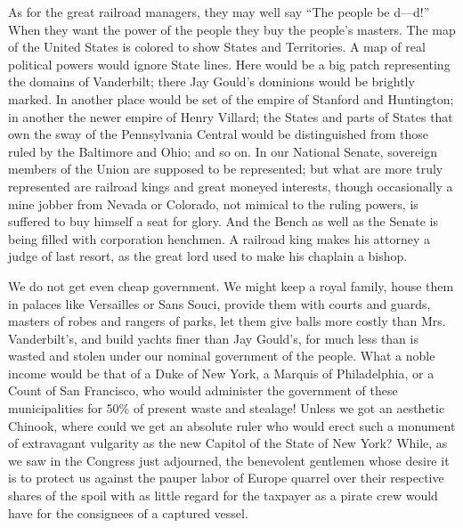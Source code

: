 \documentclass{book}
\begin{document}
As for the great railroad managers, they may well say “The people be d—d!” When they want the power of the people they buy the people’s masters. The map of the United States is colored to show States and Territories. A map of real political powers would ignore State lines. Here would be a big patch representing the domains of Vanderbilt; there Jay Gould’s dominions would be brightly marked. In another place would be set of the empire of Stanford and Huntington; in another the newer empire of Henry Villard; the States and parts of States that own the sway of the Pennsylvania Central would be distinguished from those ruled by the Baltimore and Ohio; and so on. In our National Senate, sovereign members of the Union are supposed to be represented; but what are more truly represented are railroad kings and great moneyed interests, though occasionally a mine jobber from Nevada or Colorado, not mimical to the ruling powers, is suffered to buy himself a seat for glory. And the Bench as well as the Senate is being filled with corporation henchmen. A railroad king makes his attorney a judge of last resort, as the great lord used to make his chaplain a bishop.

We do not get even cheap government. We might keep a royal family, house them in palaces like Versailles or Sans Souci, provide them with courts and guards, masters of robes and rangers of parks, let them give balls more costly than Mrs. Vanderbilt’s, and build yachts finer than Jay Gould’s, for much less than is wasted and stolen under our nominal government of the people. What a noble income would be that of a Duke of New York, a Marquis of Philadelphia, or a Count of San Francisco, who would administer the government of these municipalities for 50\% of present waste and stealage! Unless we got an aesthetic Chinook, where could we get an absolute ruler who would erect such a monument of extravagant vulgarity as the new Capitol of the State of New York? While, as we saw in the Congress just adjourned, the benevolent gentlemen whose desire it is to protect us against the pauper labor of Europe quarrel over their respective shares of the spoil with as little regard for the taxpayer as a pirate crew would have for the consignees of a captured vessel.
\end{document}
